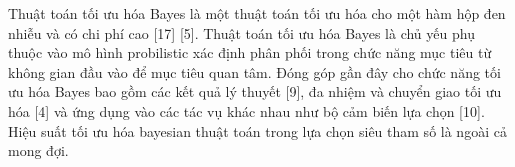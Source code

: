 Thuật toán tối ưu hóa Bayes là một thuật toán tối ưu hóa cho một hàm hộp đen nhiễu và có chi phí cao [17] [5]. Thuật toán tối ưu hóa Bayes là chủ yếu
phụ thuộc vào mô hình probilistic xác định phân phối trong
chức năng mục tiêu từ không gian đầu vào để mục tiêu quan tâm.
Đóng góp gần đây cho chức năng tối ưu hóa Bayes
bao gồm các kết quả lý thuyết  [9], đa nhiệm và chuyển giao
tối ưu hóa [4] và ứng dụng vào các tác vụ khác nhau như bộ cảm biến
lựa chọn [10]. Hiệu suất tối ưu hóa bayesian thuật toán trong lựa chọn siêu tham số là ngoài cả mong đợi.	